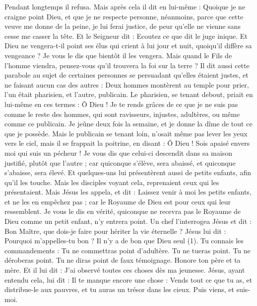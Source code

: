 \begin{multicols}{2}
Pendant longtemps il refusa. Mais après cela il dit en lui-même : Quoique je ne craigne point Dieu, et que je ne respecte personne,
néanmoins, parce que cette veuve me donne de la peine, je lui ferai justice, de peur qu'elle ne vienne sans cesse me casser la tête.
Et le Seigneur dit : Ecoutez ce que dit le juge inique.
Et Dieu ne vengera-t-il point ses élus qui crient à lui jour et nuit, quoiqu'il diffère sa vengeance ?
Je vous le dis que bientôt il les vengera. Mais quand le Fils de l'homme viendra, pensez-vous qu'il trouvera la foi sur la terre ?
Il dit aussi cette parabole au sujet de certaines personnes se persuadant qu’elles étaient justes, et ne faisant aucun cas des autres :
Deux hommes montèrent au temple pour prier, l'un était pharisien, et l'autre, publicain.
Le pharisien, se tenant debout, priait en lui-même en ces termes : Ô Dieu ! Je te rends grâces de ce que je ne suis pas comme le reste des hommes, qui sont ravisseurs, injustes, adultères, ou même comme ce publicain.
Je jeûne deux fois la semaine, et je donne la dîme de tout ce que je possède.
Mais le publicain se tenant loin, n'osait même pas lever les yeux vers le ciel, mais il se frappait la poitrine, en disant : Ô Dieu ! Sois apaisé envers moi qui suis un pécheur !
Je vous dis que celui-ci descendit dans sa maison justifié, plutôt que l'autre ; car quiconque s'élève, sera abaissé, et quiconque s'abaisse, sera élevé.
Et quelques-uns lui présentèrent aussi de petits enfants, afin qu'il les touche. Mais les disciples voyant cela, reprenaient ceux qui les présentaient.
Mais Jésus les appela, et dit : Laissez venir à moi les petits enfants, et ne les en empêchez pas ; car le Royaume de Dieu est pour ceux qui leur ressemblent.
Je vous le dis en vérité, quiconque ne recevra pas le Royaume de Dieu comme un petit enfant, n'y entrera point.
Un chef l'interrogea Jésus et dit : Bon Maître, que dois-je faire pour hériter la vie éternelle ?
Jésus lui dit : Pourquoi m'appelles-tu bon ? Il n'y a de bon que Dieu seul (1).
Tu connais les commandements : Tu ne commettras point d’adultère. Tu ne tueras point. Tu ne déroberas point. Tu ne diras point de faux témoignage. Honore ton père et ta mère.
Et il lui dit : J’ai observé toutes ces choses dès ma jeunesse.
Jésus, ayant entendu cela, lui dit : Il te manque encore une chose : Vends tout ce que tu as, et distribue-le aux pauvres, et tu auras un trésor dans les cieux. Puis viens, et suis-moi.

\end{multicols}
